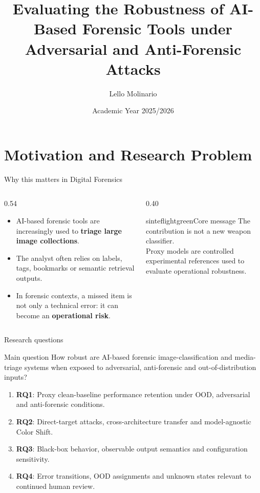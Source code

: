 \documentclass{beamer}
\title{Evaluating the Robustness of AI-Based Forensic Tools under Adversarial and Anti-Forensic Attacks}
\author{Lello Molinario}
\date{Academic Year 2025/2026}
\newcommand{\highlight}[1]{\textcolor{maincolor}{\textbf{#1}}}
\begin{document}
\maketitle

\section{Motivation and Research Problem}

\begin{frame}{Why this matters in Digital Forensics}
\begin{columns}
\begin{column}{0.54\textwidth}
\begin{itemize}
    \item AI-based forensic tools are increasingly used to \highlight{triage large image collections}.
    \item The analyst often relies on labels, tags, bookmarks or semantic retrieval outputs.
    \item In forensic contexts, a missed item is not only a technical error: it can become an \highlight{operational risk}.
\end{itemize}
\end{column}
\begin{column}{0.40\textwidth}
\begin{colorblock}[black]{sinteflightgreen}{Core message}
The contribution is not a new weapon classifier.\\[0.35em]
Proxy models are controlled experimental references used to evaluate operational robustness.
\end{colorblock}
\end{column}
\end{columns}
\end{frame}

\begin{frame}{Research questions}
\begin{block}{Main question}
How robust are AI-based forensic image-classification and media-triage systems when exposed to adversarial, anti-forensic and out-of-distribution inputs?
\end{block}

\small
\begin{enumerate}
    \item \highlight{RQ1}: Proxy clean-baseline performance retention under OOD, adversarial and anti-forensic conditions.
    \item \highlight{RQ2}: Direct-target attacks, cross-architecture transfer and model-agnostic Color Shift.
    \item \highlight{RQ3}: Black-box behavior, observable output semantics and configuration sensitivity.
    \item \highlight{RQ4}: Error transitions, OOD assignments and unknown states relevant to continued human review.
\end{enumerate}
\end{frame}
\end{document}

